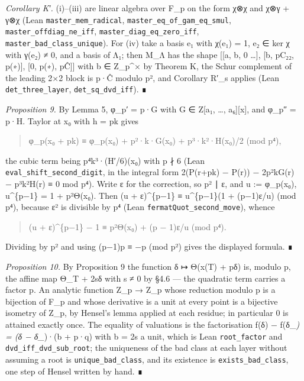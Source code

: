 \documentclass[11pt,a4paper]{article}
\theoremstyle{named}
\begin{document}
\textit{Corollary K′.} (i)–(iii) are linear algebra over F\_p on the form χ⊗χ and χ⊗γ + γ⊗χ (Lean \texttt{master\_\allowbreak{}mem\_\allowbreak{}radical}, \texttt{master\_\allowbreak{}eq\_\allowbreak{}of\_\allowbreak{}gam\_\allowbreak{}eq\_\allowbreak{}smul}, \texttt{master\_\allowbreak{}offdiag\_\allowbreak{}ne\_\allowbreak{}iff}, \texttt{master\_\allowbreak{}diag\_\allowbreak{}eq\_\allowbreak{}zero\_\allowbreak{}iff}, \texttt{master\_\allowbreak{}bad\_\allowbreak{}class\_\allowbreak{}unique}). For (iv) take a basis e₁ with χ(e₁) = 1, e₂ ∈ ker χ with γ(e₂) ≠ 0, and a basis of Λ₁; then M\_Λ has the shape [[a, b, 0 …], [b, pC₂₂, p(∗)], [0, p(∗), pĈ]] with b ∈ Z\_p\textasciicircum{}× by Theorem K, the Schur complement of the leading 2×2 block is p·Ĉ modulo p², and Corollary R′\_s applies (Lean \texttt{det\_\allowbreak{}three\_\allowbreak{}layer}, \texttt{det\_\allowbreak{}sq\_\allowbreak{}dvd\_\allowbreak{}iff}). ∎

\textit{Proposition 9.} By Lemma 5, φ\_p′ = p·G with G ∈ Z[a₁, …, a₆][x], and φ\_p″ = p·H. Taylor at x₀ with h = pk gives

\begin{quote}
φ\_p(x₀ + pk) ≡ φ\_p(x₀) + p²·k·G(x₀) + p³·k²·H(x₀)/2 (mod p⁴),
\end{quote}

the cubic term being p⁴k³·(H′/6)(x₀) with p ∤ 6 (Lean \texttt{eval\_\allowbreak{}shift\_\allowbreak{}second\_\allowbreak{}digit}, in the integral form 2(P(r+pk) − P(r)) − 2p²kG(r) − p³k²H(r) ≡ 0 mod p⁴). Write ε for the correction, so p² ∣ ε, and u := φ\_p(x₀), u\textasciicircum{}\{p−1\} = 1 + p²Θ(x₀). Then (u + ε)\textasciicircum{}\{p−1\} ≡ u\textasciicircum{}\{p−1\}(1 + (p−1)ε/u) (mod p⁴), because ε² is divisible by p⁴ (Lean \texttt{fermatQuot\_\allowbreak{}second\_\allowbreak{}move}), whence

\begin{quote}
(u + ε)\textasciicircum{}\{p−1\} − 1 ≡ p²Θ(x₀) + (p − 1)ε/u (mod p⁴).
\end{quote}

Dividing by p² and using (p−1)p ≡ −p (mod p²) gives the displayed formula. ∎

\textit{Proposition 10.} By Proposition 9 the function δ ↦ Θ(x(T) + pδ) is, modulo p, the affine map Θ\_T + 2sδ with s ≠ 0 by §4.6 — the quadratic term carries a factor p. An analytic function Z\_p → Z\_p whose reduction modulo p is a bijection of F\_p and whose derivative is a unit at every point is a bijective isometry of Z\_p, by Hensel's lemma applied at each residue; in particular 0 is attained exactly once. The equality of valuations is the factorisation f(δ) − f(δ\_\textit{) = (δ − δ\_})·(b + p·q) with b = 2s a unit, which is Lean \texttt{root\_\allowbreak{}factor} and \texttt{dvd\_\allowbreak{}iff\_\allowbreak{}dvd\_\allowbreak{}sub\_\allowbreak{}root}; the uniqueness of the bad class at each layer without assuming a root is \texttt{unique\_\allowbreak{}bad\_\allowbreak{}class}, and its existence is \texttt{exists\_\allowbreak{}bad\_\allowbreak{}class}, one step of Hensel written by hand. ∎
\end{document}

